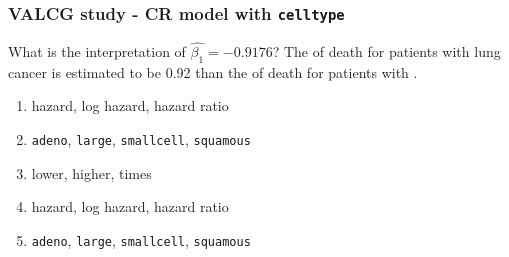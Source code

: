 \begin{frame}[fragile]
\frametitle{VALCG study - CR model with \texttt{celltype}}
\begin{clicker}{What is the interpretation of $\hat{\beta_1} = -0.9176$?  The \underline{\hspace{0.2in}{1}\hspace{0.2in}} of death for patients with \underline{\hspace{0.2in}{2}\hspace{0.2in}} lung cancer is estimated to be 0.92 \underline{\hspace{0.2in}{3}\hspace{0.2in}} than the \underline{\hspace{0.2in}{4}\hspace{0.2in}} of death for patients with \underline{\hspace{0.2in}{5}\hspace{0.2in}}.}
\begin{enumerate}
\item hazard, log hazard, hazard ratio
\item \texttt{adeno}, \texttt{large}, \texttt{smallcell}, \texttt{squamous}
\item lower, higher, times
\item hazard, log hazard, hazard ratio
\item \texttt{adeno}, \texttt{large}, \texttt{smallcell}, \texttt{squamous}
\end{enumerate}
\end{clicker}
\end{frame}

